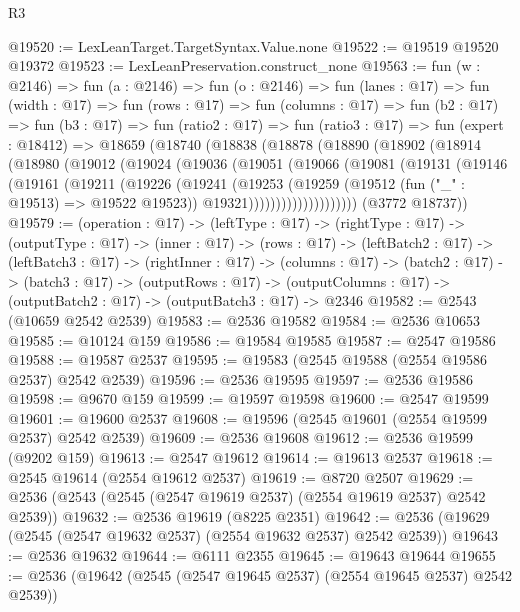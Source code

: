\begin{lexlean}{R3}
\begin{coremodule}
@19520 := LexLeanTarget.TargetSyntax.Value.none
@19522 := @19519 @19520 @19372
@19523 := LexLeanPreservation.construct_none
@19563 := fun (w : @2146) =>
  fun (a : @2146) =>
  fun (o : @2146) =>
  fun (lanes : @17) =>
  fun (width : @17) =>
  fun (rows : @17) =>
  fun (columns : @17) =>
  fun (b2 : @17) =>
  fun (b3 : @17) =>
  fun (ratio2 : @17) =>
  fun (ratio3 : @17) =>
  fun (expert : @18412) =>
  @18659
    (@18740
      (@18838
        (@18878
          (@18890
            (@18902
              (@18914
                (@18980
                  (@19012
                    (@19024
                      (@19036
                        (@19051
                          (@19066
                            (@19081
                              (@19131
                                (@19146
                                  (@19161
                                    (@19211
                                      (@19226
                                        (@19241
                                          (@19253
                                            (@19259
                                              (@19512 (fun ("_" : @19513) => @19522 @19523))
                                              @19321))))))))))))))))))))
      (@3772 @18737))
@19579 := (operation : @17) ->
  (leftType : @17) ->
  (rightType : @17) ->
  (outputType : @17) ->
  (inner : @17) ->
  (rows : @17) ->
  (leftBatch2 : @17) ->
  (leftBatch3 : @17) ->
  (rightInner : @17) ->
  (columns : @17) ->
  (batch2 : @17) ->
  (batch3 : @17) ->
  (outputRows : @17) ->
  (outputColumns : @17) -> (outputBatch2 : @17) -> (outputBatch3 : @17) -> @2346
@19582 := @2543 (@10659 @2542 @2539)
@19583 := @2536 @19582
@19584 := @2536 @10653
@19585 := @10124 @159
@19586 := @19584 @19585
@19587 := @2547 @19586
@19588 := @19587 @2537
@19595 := @19583 (@2545 @19588 (@2554 @19586 @2537) @2542 @2539)
@19596 := @2536 @19595
@19597 := @2536 @19586
@19598 := @9670 @159
@19599 := @19597 @19598
@19600 := @2547 @19599
@19601 := @19600 @2537
@19608 := @19596 (@2545 @19601 (@2554 @19599 @2537) @2542 @2539)
@19609 := @2536 @19608
@19612 := @2536 @19599 (@9202 @159)
@19613 := @2547 @19612
@19614 := @19613 @2537
@19618 := @2545 @19614 (@2554 @19612 @2537)
@19619 := @8720 @2507
@19629 := @2536 (@2543 (@2545 (@2547 @19619 @2537) (@2554 @19619 @2537) @2542 @2539))
@19632 := @2536 @19619 (@8225 @2351)
@19642 := @2536 (@19629 (@2545 (@2547 @19632 @2537) (@2554 @19632 @2537) @2542 @2539))
@19643 := @2536 @19632
@19644 := @6111 @2355
@19645 := @19643 @19644
@19655 := @2536 (@19642 (@2545 (@2547 @19645 @2537) (@2554 @19645 @2537) @2542 @2539))

\end{coremodule}
\end{lexlean}
